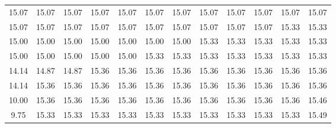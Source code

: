 \documentclass[uplatex, twocolumn,10pt]{jsarticle}
\begin{document}
\begin{table*}[tp]
\begin{tabular}{cccccccccccc}
        15.07 & 15.07 & 15.07 & 15.07 & 15.07 & 15.07 & 15.07 & 15.07 & 15.07 & 15.07 & 15.07 & 15.07 \\
        15.07 & 15.07 & 15.07 & 15.07 & 15.07 & 15.07 & 15.07 & 15.07 & 15.07 & 15.07 & 15.33 & 15.33 \\
        15.00 & 15.00 & 15.00 & 15.00 & 15.00 & 15.00 & 15.00 & 15.33 & 15.33 & 15.33 & 15.33 & 15.33 \\
        15.00 & 15.00 & 15.00 & 15.00 & 15.00 & 15.33 & 15.33 & 15.33 & 15.33 & 15.33 & 15.33 & 15.33 \\
        14.14 & 14.87 & 14.87 & 15.36 & 15.36 & 15.36 & 15.36 & 15.36 & 15.36 & 15.36 & 15.36 & 15.36 \\
        14.14 & 15.36 & 15.36 & 15.36 & 15.36 & 15.36 & 15.36 & 15.36 & 15.36 & 15.36 & 15.36 & 15.36 \\
        10.00 & 15.36 & 15.36 & 15.36 & 15.36 & 15.36 & 15.36 & 15.36 & 15.36 & 15.36 & 15.36 & 15.46 \\
        9.75  & 15.33 & 15.33 & 15.33 & 15.33 & 15.33 & 15.33 & 15.33 & 15.33 & 15.33 & 15.33 & 15.49 \\
        \hline
    \end{tabular}
\end{table*}
\end{document}
